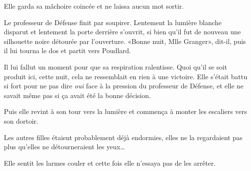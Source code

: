Elle garda sa mâchoire coincée et ne laissa aucun mot sortir.

Le professeur de Défense finit par soupirer. Lentement la lumière blanche disparut et lentement la porte derrière s'ouvrit, si bien qu'il fut de nouveau une silhouette noire détourée par l'ouverture. «Bonne nuit, Mlle Granger», dit-il, puis il lui tourna le dos et partit vers Poudlard.

Il lui fallut un moment pour que sa respiration ralentisse. Quoi qu'il se soit produit ici, cette nuit, cela ne ressemblait en rien à une victoire. Elle s'était battu si fort pour ne pas dire \emph{oui} face à la pression du professeur de Défense, et elle ne savait même pas si ça avait été la bonne décision.

Puis elle revint à son tour vers la lumière et commença à monter les escaliers vers son dortoir.

Les autres filles étaient probablement déjà endormies, elles ne la regardaient pas plus qu'elles ne détourneraient les yeux…

Elle sentit les larmes couler et cette fois elle n'essaya pas de les arrêter.
